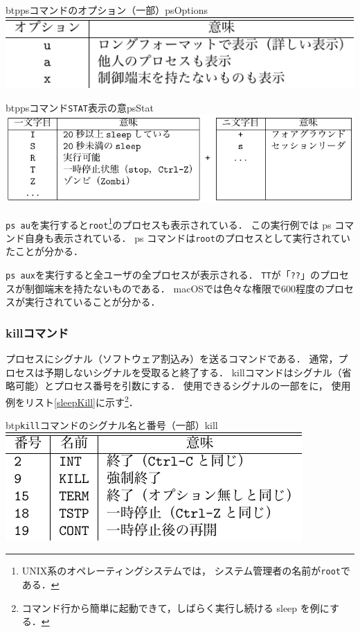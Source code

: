 \begin{mytable}{btp}{psコマンドのオプション（一部）}{psOptions}
  \includegraphics[scale=1.0]{Tbl/psOptions.pdf}
\end{mytable}



\begin{mytable}{btp}{psコマンド\texttt{STAT}表示の意}{psStat}
  \includegraphics[scale=1.0]{Tbl/psStat.pdf}
\end{mytable}

\texttt{ps au}を実行すると\texttt{root}\footnote{
UNIX系のオペレーティングシステムでは，
システム管理者の名前が\texttt{root}である．}のプロセスも表示されている．
この実行例では ps コマンド自身も表示されている．
ps コマンドは\texttt{root}のプロセスとして実行されていたことが分かる．

\texttt{ps aux}を実行すると全ユーザの全プロセスが表示される．
\texttt{TT}が「\texttt{??}」のプロセスが制御端末を持たないものである．
macOSでは色々な権限で600程度のプロセスが実行されていることが分かる．

\subsubsection{killコマンド}

プロセスにシグナル（ソフトウェア割込み）を送るコマンドである．
通常，プロセスは予期しないシグナルを受取ると終了する．
killコマンドはシグナル（省略可能）とプロセス番号を引数にする．
使用できるシグナルの一部をに，
使用例をリスト\ref{sleepKill}に示す\footnote{
コマンド行から簡単に起動できて，しばらく実行し続ける sleep を例にする．
}．

\begin{mytable}{btp}{\texttt{kill}コマンドのシグナル名と番号（一部）}{kill}
  \includegraphics[scale=1.0]{Tbl/killOptions.pdf}
\end{mytable}

